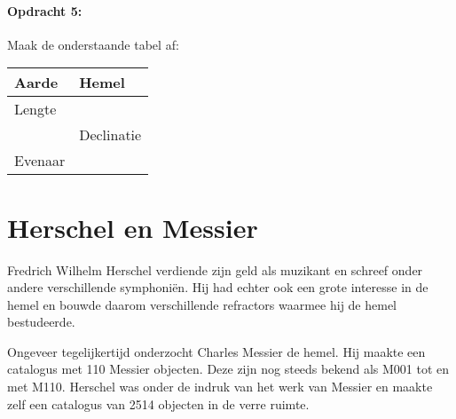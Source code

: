 \paragraph*{Opdracht 5:}

Maak de onderstaande tabel af:

\noindent \begin{flushleft}
\begin{tabular}{|>{\centering}p{5cm}|>{\centering}p{5cm}|}
\hline 
Aarde & Hemel\tabularnewline
\hline 
\hline 
Lengte & \tabularnewline
\hline 
 & Declinatie\tabularnewline
\hline 
Evenaar & \tabularnewline
\hline 
\end{tabular}
\par\end{flushleft}


\section{Herschel en Messier}

Fredrich Wilhelm Herschel verdiende zijn geld als muzikant en schreef
onder andere verschillende symphoniën. Hij had echter ook een grote
interesse in de hemel en bouwde daarom verschillende refractors waarmee
hij de hemel bestudeerde.

Ongeveer tegelijkertijd onderzocht Charles Messier de hemel. Hij maakte
een catalogus met 110 Messier objecten. Deze zijn nog steeds bekend
als M001 tot en met M110. Herschel was onder de indruk van het werk
van Messier en maakte zelf een catalogus van 2514 objecten in de verre
ruimte.

